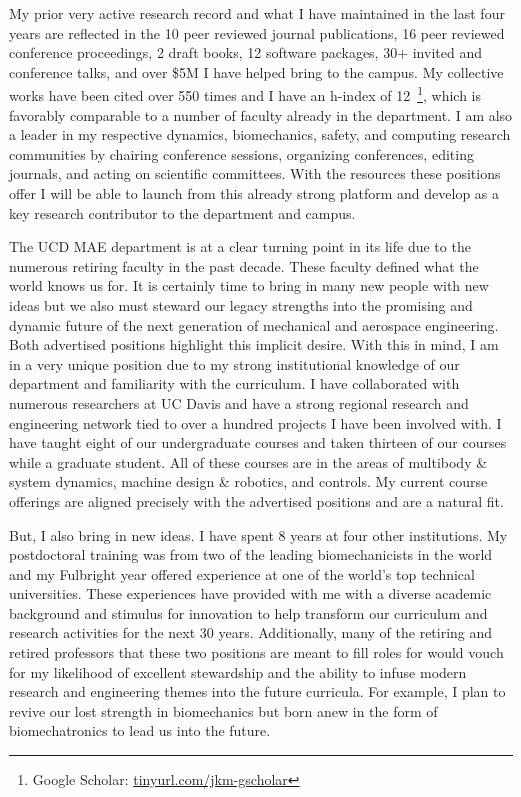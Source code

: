 \documentclass{letter}
\begin{document}
\begin{letter}
My prior very active research record and what I have maintained in the last
four years are reflected in the 10 peer reviewed journal publications, 16 peer
reviewed conference proceedings, 2 draft books, 12 software packages, 30+
invited and conference talks, and over \$5M I have helped bring to the campus.
My collective works have been cited over 550 times and I have an h-index of
12~\footnote{Google Scholar:
\href{http://tinyurl.com/jkm-gscholar}{tinyurl.com/jkm-gscholar}}, which is
favorably comparable to a number of faculty already in the department. I am
also a leader in my respective dynamics, biomechanics, safety, and computing
research communities by chairing conference sessions, organizing conferences,
editing journals, and acting on scientific committees.  With the resources
these positions offer I will be able to launch from this already strong
platform and develop as a key research contributor to the department and
campus.

The UCD MAE department is at a clear turning point in its life due to the
numerous retiring faculty in the past decade. These faculty defined what the
world knows us for. It is certainly time to bring in many new people with new
ideas but we also must steward our legacy strengths into the promising and
dynamic future of the next generation of mechanical and aerospace engineering.
Both advertised positions highlight this implicit desire. With this in mind, I
am in a very unique position due to my strong institutional knowledge of our
department and familiarity with the curriculum. I have collaborated with
numerous researchers at UC Davis and have a strong regional research and
engineering network tied to over a hundred projects I have been involved with.
I have taught eight of our undergraduate courses and taken thirteen of our
courses while a graduate student. All of these courses are in the areas of
multibody \& system dynamics, machine design \& robotics, and controls. My
current course offerings are aligned precisely with the advertised positions
and are a natural fit.

But, I also bring in new ideas. I have spent 8 years at four other
institutions. My postdoctoral training was from two of the leading
biomechanicists in the world and my Fulbright year offered experience at one of
the world's top technical universities. These experiences have provided with me
with a diverse academic background and stimulus for innovation to help
transform our curriculum and research activities for the next 30 years.
Additionally, many of the retiring and retired professors that these two
positions are meant to fill roles for would vouch for my likelihood of
excellent stewardship and the ability to infuse modern research and engineering
themes into the future curricula. For example, I plan to revive our lost
strength in biomechanics but born anew in the form of biomechatronics to lead
us into the future.


\end{letter}
\end{document}
